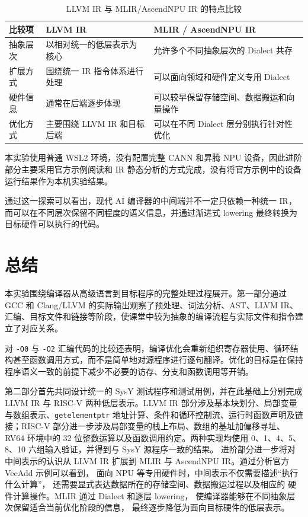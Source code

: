 \documentclass[12pt,a4paper]{ctexart}
\begin{document}
\begin{table}[H]
\centering
\caption{LLVM IR 与 MLIR/AscendNPU IR 的特点比较}
\begin{tabularx}{\textwidth}{@{}p{2.8cm}X X@{}}
\toprule
比较项 & LLVM IR & MLIR / AscendNPU IR \\
\midrule

抽象层次 &
以相对统一的低层表示为核心 &
允许多个不同抽象层次的 Dialect 共存 \\

扩展方式 &
围绕统一 IR 指令体系进行处理 &
可以面向领域和硬件定义专用 Dialect \\

硬件信息 &
通常在后端逐步体现 &
可以较早保留存储空间、数据搬运和向量操作 \\

优化方式 &
主要围绕 LLVM IR 和目标后端 &
可以在不同 Dialect 层分别执行针对性优化 \\

\bottomrule
\end{tabularx}
\end{table}

本实验使用普通 WSL2 环境，没有配置完整 CANN 和昇腾 NPU 设备，因此进阶部分主要采用官方示例阅读和 IR 静态分析的方式完成，没有将官方示例中的设备运行结果作为本机实验结果。

通过这一探索可以看出，现代 AI 编译器的中间端并不一定只依赖一种统一 IR，而可以在不同层次保留不同程度的语义信息，并通过渐进式 lowering 最终转换为目标硬件可以执行的代码。

\section{总结}

本实验围绕编译器从高级语言到目标程序的完整处理过程展开。第一部分通过 GCC 和 Clang/LLVM 的实际输出观察了预处理、词法分析、AST、LLVM IR、汇编、目标文件和链接等阶段，使课堂中较为抽象的编译流程与实际文件和指令建立了对应关系。

对 \texttt{-O0} 与 \texttt{-O2} 汇编代码的比较还表明，编译优化会重新组织寄存器使用、循环结构甚至函数调用方式，而不是简单地对源程序进行逐句翻译。优化的目标是在保持程序语义一致的前提下减少不必要的访存、分支和函数调用等开销。

第二部分首先共同设计统一的 SysY 测试程序和测试用例，并在此基础上分别完成 LLVM IR 与 RISC-V 两种低层表示。LLVM IR 部分涉及基本块划分、局部变量与数组表示、\texttt{getelementptr} 地址计算、条件和循环控制流、运行时函数声明及链接；RISC-V 部分进一步涉及局部变量的栈上布局、数组的基址加偏移寻址、RV64 环境中的 32 位整数运算以及函数调用约定。两种实现均使用 0、1、4、5、8、10 六组输入验证，并得到与 SysY 源程序一致的结果。
进阶部分进一步将对中间表示的认识从 LLVM IR 扩展到
MLIR 与 AscendNPU IR。通过分析官方 VecAdd 示例可以看到，
面向 NPU 等专用硬件时，中间表示不仅需要描述“执行什么计算”，
还需要显式表达数据所在的存储空间、数据搬运过程以及相应的
硬件计算操作。MLIR 通过 Dialect 和逐层 lowering，
使编译器能够在不同抽象层次保留适合当前优化阶段的信息，
最终逐步降低为面向目标硬件的低层表示。
\end{document}
